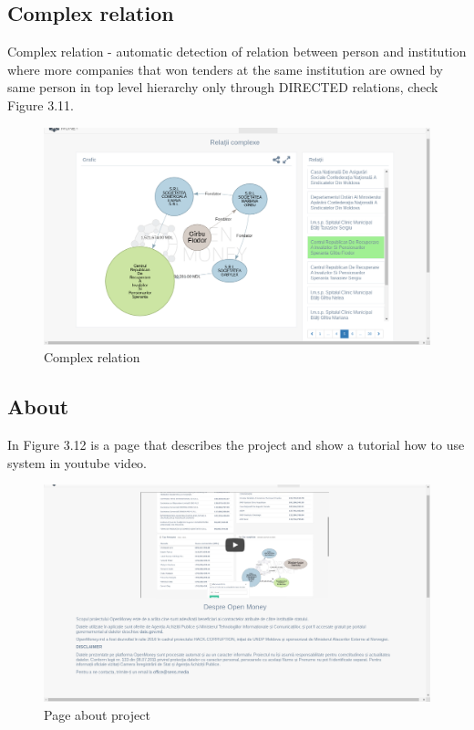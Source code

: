 \documentclass[12pt,a4paper,titlepage]{article}
\begin{document}
\subsection{Complex relation}

Complex relation - automatic detection of relation between person and institution where more companies that won tenders at the same institution are owned by same person in top level hierarchy only through DIRECTED relations, check Figure 3.11.\\

	\begin{figure}[!ht] 
	\renewcommand\thefigure{3.11} %
	\centering 
	\includegraphics[width=17cm]{complex_relation.png} 
	\caption{ Complex relation  }\label{fig4} 
	\end{figure}
	
	\newpage
	\subsection{About}
	
In Figure 3.12 is a page that describes the project and show a tutorial how to use system in youtube video.	
	
	\begin{figure}[!ht] 
	\renewcommand\thefigure{3.12} %
	\centering 
	\includegraphics[width=17cm]{about.png} 
	\caption{ Page about project }\label{fig4} 
	\end{figure}
	
\end{document}
